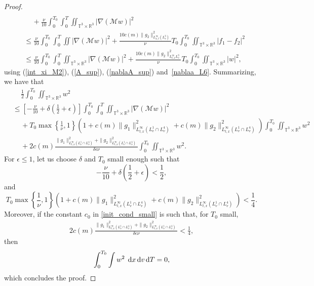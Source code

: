 \documentclass[11pt,american, reqno]{amsart}
\numberwithin{equation}{section}
\newcommand{\R}{\mathbb R}
\newcommand{\1}{\mathds{1}}
\newcommand{\dT}{\, {\rm d} T}
\newcommand{\dv}{\, {\rm d} v}
\newcommand{\dx}{\, {\rm d} x}
\newcommand{\CalM}{\mathcal{M}}
\newcommand{\Eps}{\epsilon}
\newcommand{\T}{\mathbb{T}}
\numberwithin{equation}{section}
\begin{document}
\begin{proof}
\begin{align*}
\\
& \quad \,
+ \frac{\nu}{10}\int_0^{T_0}\int_0^{T} \iint_{\T^3 \times \R^3} |\nabla(\CalM w)| ^2 %
\\
&\le  
\frac{\nu}{10}\int_0^{T_0}\int_0^{T} \iint |\nabla(\CalM w)|^2 %
+ \frac{10 c(m) \|g_2\|^2_{L_{x,t}^\infty (L^3_v)}}{\nu} T_0 \int_0^{T_0} \iint_{\T^3 \times \R^3} | f_1-f_2|^2 %
\\
&\le 
\frac{\nu}{10}\int_0^{T_0}\int_0^{T} \iint_{\T^3 \times \R^3} |\nabla(\CalM w)| ^2 %
+ \frac{10 c(m)\|g_2\|^2_{L_{t,x}^\infty L^3_v}}{\nu}T_0  \int_0^{T_0} \iint_{\T^3 \times \R^3}  | w|^2, %
\end{align*}
using (\ref{int_xi_M2}), (\ref{A_sup}), (\ref{nablaA_sup}) and~\eqref{nablaa_L6}. 
Summarizing, we have that
\begin{align*}
& \quad \,
\frac{1}{2} \int_0^{T_0}\iint_{\T^3 \times \R^3}  {w}^2
\\
& \le 
\left[ -\frac{\nu}{10}+ \delta\left( \frac{1}{2} + \Eps \right)  \right] \int_0^{T_0}  \int_0^{T} \iint_{\T^3 \times \R^3} |\nabla(\CalM w)|^2 %
\\
& \quad \, 
+ T_0\max \left\{ \frac{1}{\nu}, 1\right\} \left( 1 +c(m) \|g_1\|^2_{L^\infty_{t,x}(L_v^1\cap L_v^4)} + c(m) \|g_2\|^2_{L^\infty_{t,x}(L_v^1\cap L_v^4)} \right)
\int_0^{T_0} \iint_{\T^3 \times \R^3} {w}^2 %
\\
& \quad \,
+ 2 c(m) \frac{\|g_1\|^2_{L^\infty_{t,x}(L_v^1\cap L_v^4)} + \|g_2\|^2_{L^\infty_{t,x}(L_v^1\cap L_v^4)}}{\delta \Eps \nu} \int_0^{T_0} \iint_{\T^3 \times \R^3} {w}^2. %
\end{align*}
For $\Eps \le 1$, let us choose $\delta$ and $T_0$ small enough such that 
$$
 -\frac{\nu}{10}+ \delta\left( \frac{1}{2} + \Eps \right)  < \frac{1}{2},
$$
and 
$$
 T_0\max \left\{ \frac{1}{\nu}, 1\right\} \left( 1 + c(m)\|g_1\|^2_{L^\infty_{t,x}(L_v^1\cap L_v^4)} + c(m) \|g_2\|^2_{L^\infty_{t,x}(L_v^1\cap L_v^4)}\right) < \frac{1}{4}. 
$$
Moreover, if the constant $c_0$ in \eqref{init_cond_small} is such that, for $T_0$ small,    
\begin{align}\label{cond_small}
2 c(m) \frac{\|g_1\|^2_{L^\infty_{t,x}(L_v^1\cap L_v^4)} + \|g_2\|^2_{L^\infty_{t,x}(L_v^1\cap L_v^4)}}{\delta \Eps \nu}   < \frac{1}{4},
\end{align}
then 
$$
\int_0^{T_0} \int w^2\; \dx\dv\dT =0, 
$$
which concludes the proof.     
\end{proof}
\end{document}
